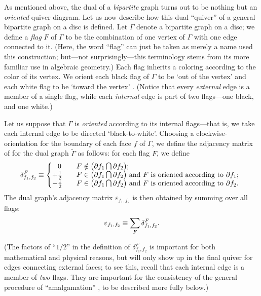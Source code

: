 \documentclass[12pt,hyperref,compress]{JHEP3}
\newcommand{\newcap}{{\small\mathrm{\raisebox{0.95pt}{{$\,\bigcap\,$}}}}}
\newcommand{\eq}[1]{\begin{equation}#1\end{equation}}
\begin{document}
As mentioned above, the dual of a {\it bipartite} graph turns out to be nothing but an {\it oriented} quiver diagram. Let us now describe how this dual ``quiver'' of a general bipartite graph on a disc is defined. Let $\Gamma$ denote a bipartite graph on a disc; we define a {\it flag} $F$ of $\Gamma$ to be the combination of one vertex of $\Gamma$ with one edge connected to it. (Here, the word ``flag'' can just be taken as merely a name used this construction; but---not surprisingly---this terminology stems from its more familiar use in algebraic geometry.) Each flag inherits a coloring according to the color of its vertex. We orient each black flag of $\Gamma$ to be `out of the vertex' and each white flag to be `toward the vertex' . (Notice that every {\it external} edge is a member of a single flag, while each {\it internal} edge is part of two flags---one black, and one white.)

Let us suppose that $\Gamma$ is {\it oriented} according to its internal flags---that is, we take each internal edge to be directed `black-to-white'. Choosing a clockwise-orientation for the boundary of each face $f$ of $\Gamma$, we define the adjacency matrix of for the dual graph $\widetilde\Gamma$ as follows: for each flag $F$, we define
\vspace{-.2cm}\eq{\nonumber\delta^F_{f_1,f_2}\equiv\left\{ \begin{array}{@{}l@{$\qquad$}l} \phantom{+}0 & \mbox{$F\notin\big(\partial f_1\newcap\partial f_2\big);$}\\ +\frac{1}{2}& \mbox{$F\in\big(\partial f_1\newcap\partial f_2\big)$ and $F$ is oriented according to $\partial f_1;$}\\-\frac{1}{2}& \mbox{$F\in\big(\partial f_1\newcap\partial f_2\big)$ and $F$ is oriented according to $\partial f_2.$}\end{array}\right.\label{123a}\vspace{-.2cm}}
The dual graph's adjacency matrix $\varepsilon_{f_1,f_2}$ is then obtained by summing over all flags:\\[-6pt]
\vspace{-.2cm}\eq{\varepsilon_{f_1,f_2} \equiv \sum_F\delta^F_{f_1, f_2}.\vspace{-.2cm}\label{123f}}

(The factors of ``$1/2$'' in the definition of $\delta^F_{f_1,f_2}$ is important for both mathematical and physical reasons, but will only show up in the final quiver for edges connecting external faces; to see this, recall that each internal edge is a member of  {\it two} flags. They are important for the consistency of the general procedure of ``amalgamation'' \cite{FG3}, to be described more fully below.)
\end{document}
